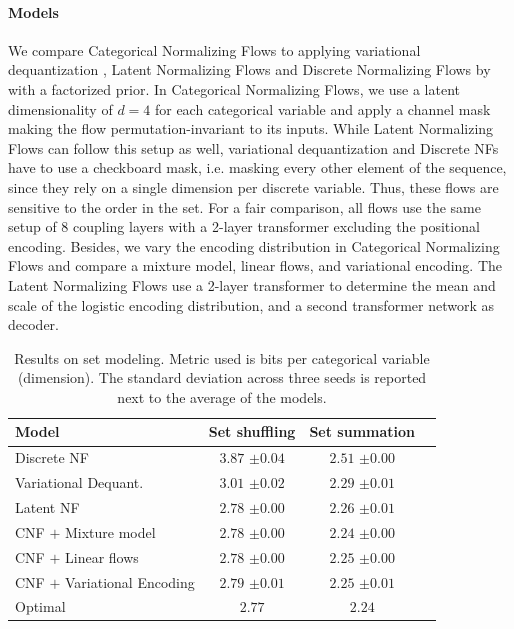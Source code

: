 \paragraph{Models} We compare Categorical Normalizing Flows to applying variational dequantization \cite{Flow++}, Latent Normalizing Flows \cite{SemiDiscreteNFSequence} and Discrete Normalizing Flows by \citet{TranDiscreteFlows} with a factorized prior. 
In Categorical Normalizing Flows, we use a latent dimensionality of $d=4$ for each categorical variable and apply a channel mask making the flow permutation-invariant to its inputs.
While Latent Normalizing Flows can follow this setup as well, variational dequantization and Discrete NFs have to use a checkboard mask, i.e. masking every other element of the sequence, since they rely on a single dimension per discrete variable. Thus, these flows are sensitive to the order in the set.
For a fair comparison, all flows use the same setup of 8 coupling layers with a 2-layer transformer \cite{AttentionIsAllYouNeed} excluding the positional encoding. 
Besides, we vary the encoding distribution in Categorical Normalizing Flows and compare a mixture model, linear flows, and variational encoding.
The Latent Normalizing Flows use a 2-layer transformer to determine the mean and scale of the logistic encoding distribution, and a second transformer network as decoder.

\begin{table}[t!]
	\caption[Results on set modeling]{Results on set modeling. Metric used is bits per categorical variable (dimension). The standard deviation across three seeds is reported next to the average of the models.}
	\label{tab:result_table_sets}
	\centering
	\begin{tabular}{lccc}
		\toprule
		\textbf{Model} & \textbf{Set shuffling} & \textbf{Set summation} \\
		\midrule
		Discrete NF \cite{TranDiscreteFlows} & $3.87$ \footnotesize{$\pm0.04$} & $2.51$ \footnotesize{$\pm0.00$}\\
		Variational Dequant. \cite{Flow++} & $3.01$ \footnotesize{$\pm0.02$} & $2.29$ \footnotesize{$\pm0.01$}\\
		Latent NF \cite{SemiDiscreteNFSequence} & $\bm{2.78}$  \footnotesize{$\pm0.00$} & $2.26$ \footnotesize{$\pm0.01$}\\[4pt]
		CNF $+$ Mixture model & $\bm{2.78}$ \footnotesize{$\pm0.00$} & $\bm{2.24}$  \footnotesize{$\pm0.00$}\\
		CNF $+$ Linear flows & $\bm{2.78}$ \footnotesize{$\pm0.00$} & $2.25$ \footnotesize{$\pm0.00$}\\
		CNF $+$ Variational Encoding & $2.79$ \footnotesize{$\pm0.01$} & $2.25$ \footnotesize{$\pm0.01$}\\
		\midrule 
		Optimal & $2.77$ & $2.24$ \\
		\bottomrule
	\end{tabular}
\end{table}

